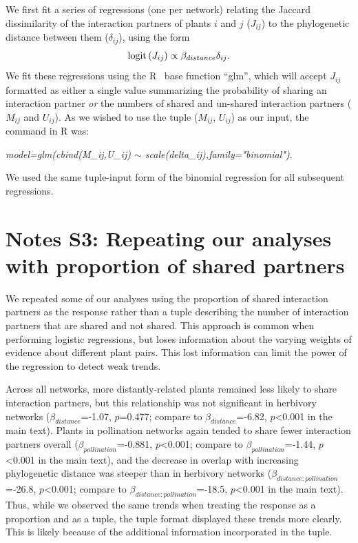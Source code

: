 \documentclass[12pt]{article}
\begin{document}
\begin{spacing}{1.5}
    
    We first fit a series of regressions (one per network) relating the Jaccard dissimilarity of the interaction partners of plants $i$ and $j$ ($J_{ij}$) to the phylogenetic  distance between them ($\delta_{ij}$), using the form
      \begin{equation}
        {\rm logit}\left(J_{ij}\right) \propto \beta_{distance}\delta_{ij} .
        \label{basic}
      \end{equation}
    We fit these regressions using the R~\citep{R} base function ``glm'', which will accept $J_{ij}$ formatted as either a single value summarizing the probability of sharing an interaction partner \emph{or} the numbers of shared and un-shared interaction partners ($M_{ij}$ and $U_{ij}$). As we wished to use the tuple ($M_{ij}$, $U_{ij}$) as our input, the command in R was:


    \emph{model=glm(cbind(M\_ij,U\_ij) $\sim$ scale(delta\_ij),family="binomial")}.


    We used the same tuple-input form of the binomial regression for all subsequent regressions.


\clearpage

\section*{Notes S3: Repeating our analyses with proportion of shared partners}

    We repeated some of our analyses using the proportion of shared interaction partners as the response rather than a tuple describing the number of interaction partners that are shared and not shared. This approach is common when performing logistic regressions, but loses information about the varying weights of evidence about different plant pairs. This lost information can limit the power of the regression to detect weak trends.


    Across all networks, more distantly-related plants remained less likely
    to share interaction partners, but this relationship was not significant 
    in herbivory networks ($\beta_{distance}$=-1.07, $p$=0.477; compare to 
    $\beta_{distance}$=-6.82, $p$\textless0.001 in the main text). Plants in pollination networks again tended to share fewer interaction partners overall ($\beta_{pollination}$=-0.881, $p$\textless0.001; compare to $
    \beta_{pollination}$=-1.44, $p$\textless0.001 in the main text), and the decrease in overlap with increasing phylogenetic distance was steeper than in herbivory networks ($\beta_{distance:pollination}$=-26.8, $p$\textless0.001; compare to $\beta_{distance:pollination}$=-18.5, $p$\textless0.001 in the main text). Thus, while we observed the same trends when treating the response as a proportion and as a tuple, the tuple format displayed these trends more clearly. This is likely because of the additional information incorporated in the tuple.



\end{spacing}
\end{document}
